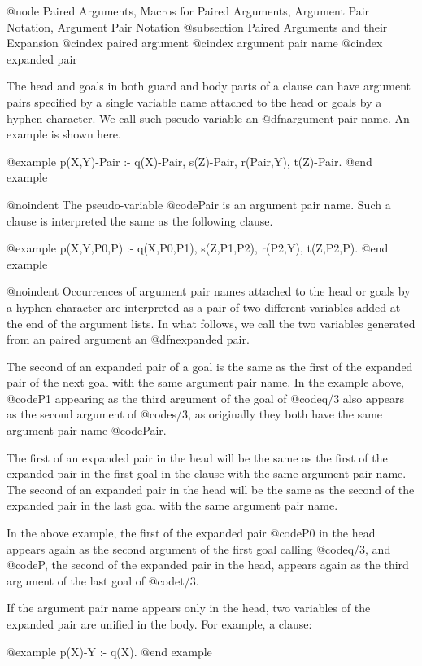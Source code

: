 @node Paired Arguments, Macros for Paired Arguments, Argument Pair Notation, Argument Pair Notation
@subsection Paired Arguments and their Expansion
@cindex paired argument
@cindex argument pair name
@cindex expanded pair

The head and goals in both guard and body parts of a clause can have
argument pairs specified by a single variable name attached to the head
or goals by a hyphen character.  We call such pseudo variable an
@dfn{argument pair name}.  An example is shown here.

@example
p(X,Y)-Pair :- q(X)-Pair, s(Z)-Pair, r(Pair,Y), t(Z)-Pair.
@end example

@noindent
The pseudo-variable @code{Pair} is an argument pair name.  Such a clause
is interpreted the same as the following clause.

@example
p(X,Y,P0,P) :- q(X,P0,P1), s(Z,P1,P2), r(P2,Y), t(Z,P2,P).
@end example

@noindent
Occurrences of argument pair names attached to the head or goals by a
hyphen character are interpreted as a pair of two different variables
added at the end of the argument lists.  In what follows, we call the
two variables generated from an paired argument an @dfn{expanded pair}.

The second of an expanded pair of a goal is the same as the first of the
expanded pair of the next goal with the same argument pair name.  In the
example above, @code{P1} appearing as the third argument of the goal of
@code{q/3} also appears as the second argument of @code{s/3}, as
originally they both have the same argument pair name @code{Pair}.

The first of an expanded pair in the head will be the same as the first
of the expanded pair in the first goal in the clause with the same
argument pair name.  The second of an expanded pair in the head will be
the same as the second of the expanded pair in the last goal with the
same argument pair name.

In the above example, the first of the expanded pair @code{P0} in the
head appears again as the second argument of the first goal calling
@code{q/3}, and @code{P}, the second of the expanded pair in the head,
appears again as the third argument of the last goal of @code{t/3}.

If the argument pair name appears only in the head, two variables of the
expanded pair are unified in the body.  For example, a clause:

@example
p(X)-Y :- q(X).
@end example

